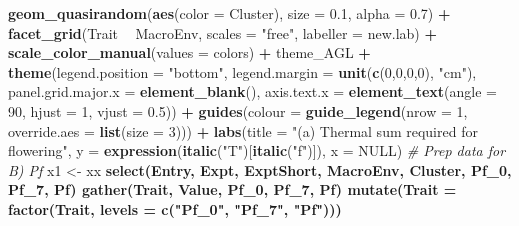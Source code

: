 \documentclass[
]{article}
\newenvironment{Shaded}{\begin{snugshade}}{\end{snugshade}}
\newcommand{\CommentTok}[1]{\textcolor[rgb]{0.56,0.35,0.01}{\textit{#1}}}
\newcommand{\DataTypeTok}[1]{\textcolor[rgb]{0.13,0.29,0.53}{#1}}
\newcommand{\DecValTok}[1]{\textcolor[rgb]{0.00,0.00,0.81}{#1}}
\newcommand{\FloatTok}[1]{\textcolor[rgb]{0.00,0.00,0.81}{#1}}
\newcommand{\KeywordTok}[1]{\textcolor[rgb]{0.13,0.29,0.53}{\textbf{#1}}}
\newcommand{\NormalTok}[1]{#1}
\newcommand{\OperatorTok}[1]{\textcolor[rgb]{0.81,0.36,0.00}{\textbf{#1}}}
\newcommand{\OtherTok}[1]{\textcolor[rgb]{0.56,0.35,0.01}{#1}}
\newcommand{\StringTok}[1]{\textcolor[rgb]{0.31,0.60,0.02}{#1}}
\begin{document}
\begin{Shaded}
\begin{Highlighting}[]
{{{{{{\StringTok{  }\KeywordTok{geom_quasirandom}\NormalTok{(}\KeywordTok{aes}\NormalTok{(}\DataTypeTok{color =}\NormalTok{ Cluster), }\DataTypeTok{size =} \FloatTok{0.1}\NormalTok{, }\DataTypeTok{alpha =} \FloatTok{0.7}\NormalTok{) }\OperatorTok{+}\StringTok{ }
\StringTok{  }\KeywordTok{facet_grid}\NormalTok{(Trait }\OperatorTok{~}\StringTok{ }\NormalTok{MacroEnv, }\DataTypeTok{scales =} \StringTok{"free"}\NormalTok{, }\DataTypeTok{labeller =}\NormalTok{ new.lab) }\OperatorTok{+}
\StringTok{  }\KeywordTok{scale_color_manual}\NormalTok{(}\DataTypeTok{values =}\NormalTok{ colors) }\OperatorTok{+}
\StringTok{  }\NormalTok{theme_AGL }\OperatorTok{+}
\StringTok{  }\KeywordTok{theme}\NormalTok{(}\DataTypeTok{legend.position =} \StringTok{"bottom"}\NormalTok{, }
        \DataTypeTok{legend.margin =} \KeywordTok{unit}\NormalTok{(}\KeywordTok{c}\NormalTok{(}\DecValTok{0}\NormalTok{,}\DecValTok{0}\NormalTok{,}\DecValTok{0}\NormalTok{,}\DecValTok{0}\NormalTok{), }\StringTok{"cm"}\NormalTok{),}
        \DataTypeTok{panel.grid.major.x =} \KeywordTok{element_blank}\NormalTok{(),}
        \DataTypeTok{axis.text.x =} \KeywordTok{element_text}\NormalTok{(}\DataTypeTok{angle =} \DecValTok{90}\NormalTok{, }\DataTypeTok{hjust =} \DecValTok{1}\NormalTok{, }\DataTypeTok{vjust =} \FloatTok{0.5}\NormalTok{)) }\OperatorTok{+}
\StringTok{  }\KeywordTok{guides}\NormalTok{(}\DataTypeTok{colour =} \KeywordTok{guide_legend}\NormalTok{(}\DataTypeTok{nrow =} \DecValTok{1}\NormalTok{, }\DataTypeTok{override.aes =} \KeywordTok{list}\NormalTok{(}\DataTypeTok{size =} \DecValTok{3}\NormalTok{))) }\OperatorTok{+}
\StringTok{  }\KeywordTok{labs}\NormalTok{(}\DataTypeTok{title =} \StringTok{"(a) Thermal sum required for flowering"}\NormalTok{, }
       \DataTypeTok{y =} \KeywordTok{expression}\NormalTok{(}\KeywordTok{italic}\NormalTok{(}\StringTok{"T"}\NormalTok{)[}\KeywordTok{italic}\NormalTok{(}\StringTok{"f"}\NormalTok{)]), }\DataTypeTok{x =} \OtherTok{NULL}\NormalTok{)}
\CommentTok{# Prep data for B) Pf}
\NormalTok{x1 <-}\StringTok{ }\NormalTok{xx }\OperatorTok{%
\StringTok{  }\KeywordTok{select}\NormalTok{(Entry, Expt, ExptShort, MacroEnv, Cluster, Pf_}\DecValTok{0}\NormalTok{, Pf_}\DecValTok{7}\NormalTok{, Pf) }\OperatorTok{%
\StringTok{  }\KeywordTok{gather}\NormalTok{(Trait, Value, Pf_}\DecValTok{0}\NormalTok{, Pf_}\DecValTok{7}\NormalTok{, Pf) }\OperatorTok{%
\StringTok{  }\KeywordTok{mutate}\NormalTok{(}\DataTypeTok{Trait =} \KeywordTok{factor}\NormalTok{(Trait, }\DataTypeTok{levels =} \KeywordTok{c}\NormalTok{(}\StringTok{"Pf_0"}\NormalTok{, }\StringTok{"Pf_7"}\NormalTok{, }\StringTok{"Pf"}\NormalTok{)))}
}}}}}}}}}
\end{Highlighting}
\end{Shaded}
\end{document}
